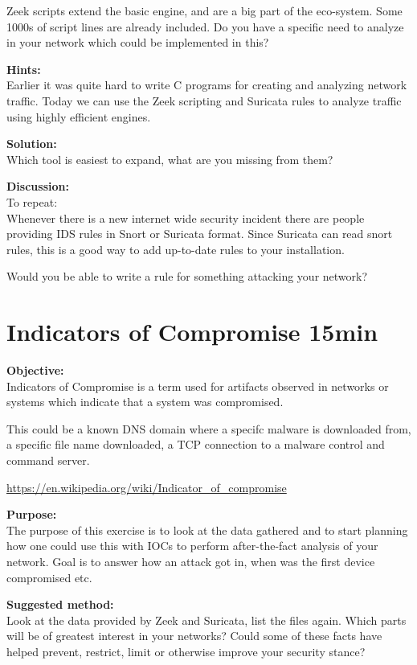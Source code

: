 \documentclass[a4paper,11pt,notitlepage]{report}
\begin{document}
Zeek scripts extend the basic engine, and are a big part of the eco-system. Some 1000s of script lines are already included. Do you have a specific need to analyze in your network which could be implemented in this?

{\bf Hints:}\\
Earlier it was quite hard to write C programs for creating and analyzing network traffic. Today we can use the Zeek scripting and Suricata rules to analyze traffic using highly efficient engines.


{\bf Solution:}\\
Which tool is easiest to expand, what are you missing from them?


{\bf Discussion:}\\

To repeat:\\
Whenever there is a new internet wide security incident there are people providing IDS rules in Snort or Suricata format. Since Suricata can read snort rules, this is a good way to add up-to-date rules to your installation.

Would you be able to write a rule for something attacking your network?

\chapter{Indicators of Compromise 15min}
\label{ex:zeekioc}


{\bf Objective:} \\
Indicators of Compromise is a term used for artifacts observed in networks or systems which indicate that a system was compromised.

This could be a known DNS domain where a specifc malware is downloaded from, a specific file name downloaded, a TCP connection to a malware control and command server.

\url{https://en.wikipedia.org/wiki/Indicator_of_compromise}

{\bf Purpose:}\\
The purpose of this exercise is to look at the data gathered and to start planning how one could use this with IOCs to perform after-the-fact analysis of your network. Goal is to answer how an attack got in, when was the first device compromised etc.


{\bf Suggested method:}\\
Look at the data provided by Zeek and Suricata, list the files again.
Which parts will be of greatest interest in your networks? Could some of these facts have helped prevent, restrict, limit or otherwise improve your security stance?
\end{document}
